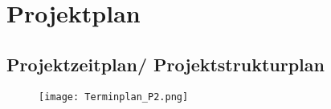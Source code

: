 \section{Projektplan}

\subsection{Projektzeitplan/ Projektstrukturplan}
\begin{figure}[H]
	\centering
	\texttt{[image: Terminplan\_P2.png]}
	\label{fig:Terminplan}
\end{figure}



